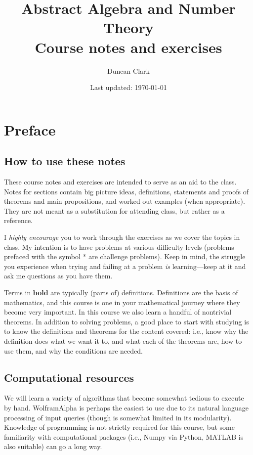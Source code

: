 \documentclass[12pt]{article}
\numberwithin{equation}{subsection}
\theoremstyle{note}
\begin{document}
%


\title{ \textbf{Abstract Algebra and Number Theory \\ Course notes and exercises
 }}
\author{\small Duncan Clark}
\date{\small Last updated: \today}

\setcounter{section}{-1}
\maketitle
\tableofcontents

\section{Preface}


\subsection{How to use these notes} These course notes and exercises are intended to serve as an aid to the class. Notes for sections contain big picture ideas, definitions, statements and proofs of theorems and main propositions, and worked out examples (when appropriate). They are not meant as a substitution for attending class, but rather as a reference. 

I \textit{highly encourage} you to work through the exercises as we cover the topics in class. My intention is to have problems at various difficulty levels (problems prefaced with the symbol * are challenge problems). Keep in mind, the struggle you experience when trying and failing at a problem \textit{is} learning---keep at it and ask me questions as you have them. 


Terms in \textbf{bold} are typically (parts of) definitions. Definitions are the basis of mathematics, and this course is one in your mathematical journey where they become very important. In this course we also learn a handful of nontrivial theorems. In addition to solving problems, a good place to start with studying is to know the definitions and theorems for the content covered: i.e., know why the definition does what we want it to, and  what each of the theorems are, how to use them, and why the conditions are needed.

\subsection{Computational resources}
We will learn a variety of algorithms that become somewhat tedious to execute by hand.  WolframAlpha is perhaps the easiest to use due to its natural language processing of input queries (though is somewhat limited in its modularity). Knowledge of programming is not strictly required for this course, but some familiarity with computational packages (i.e., Numpy via Python, MATLAB is also suitable) can go a long way.
\end{document}
